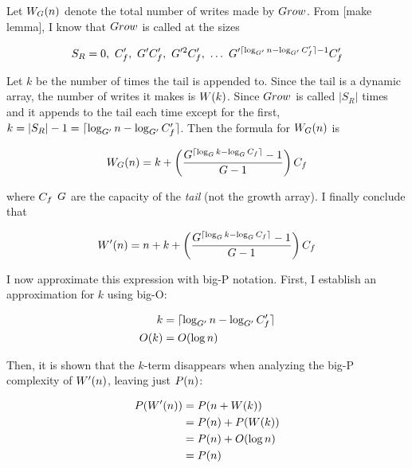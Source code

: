 Let $W_G(n)$ denote the total number of writes made by $Grow$. From [make lemma], I know that $Grow$ is called at the sizes

$$
S_R = 0,\ \initcapacitynew,\ \growthfactornew\initcapacitynew,\ \growthfactornew^2\initcapacitynew,\ \ldots\ \growthfactornew^{\lceil \log_{\growthfactornew} \varnitems - \log_{\growthfactornew} \initcapacitynew \rceil - 1}\initcapacitynew
$$

Let $k$ be the number of times the tail is appended to. Since the tail is a dynamic array, the number of writes it makes is $W(k)$. Since $Grow$ is called $|S_R|$ times and it appends to the tail each time except for the first, $k = |S_R| - 1 = \lceil \log_{G'} n - \log_{G'} C_f' \rceil$. Then the formula for $W_G(n)$ is

$$
W_G(n) = k + \left( \frac{G^{\lceil \log_{G} k - \log_{G} C_f \rceil} - 1}{G - 1} \right) C_f
$$

where $C_f$ $G$ are the capacity of the \textit{tail} (not the growth array). I finally conclude that

$$
W'(n) = n + k + \left( \frac{G^{\lceil \log_{G} k - \log_{G} C_f \rceil} - 1}{G - 1} \right) C_f
$$

I now approximate this expression with big-P notation. First, I establish an approximation for $k$ using big-O:

\begin{align*}
k &= \lceil \log_{G'} n - \log_{G'} C_f' \rceil\\
O(k) &= O(\log n)
\end{align*}

Then, it is shown that the $k$-term disappears when analyzing the big-P complexity of $W'(n)$, leaving just $P(n)$:

\begin{align*}
P(W'(n)) &= P(n + W(k))\\
&= P(n) + P(W(k))\\
&= P(n) + O(\log n)\\
&= P(n)
\end{align*}

